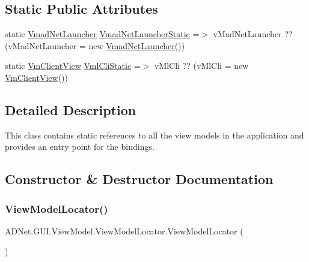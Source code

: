 \subsection*{Static Public Attributes}
\begin{DoxyCompactItemize}
\item 
static \hyperlink{class_a_d_net_1_1_g_u_i_1_1_view_model_1_1_vmad_net_launcher}{Vmad\+Net\+Launcher} \hyperlink{class_a_d_net_1_1_g_u_i_1_1_view_model_1_1_view_model_locator_a04e0f62e6c93901369e1f394255f9dd4}{Vmad\+Net\+Launcher\+Static} =$>$ v\+Mad\+Net\+Launcher ?? (v\+Mad\+Net\+Launcher = new \hyperlink{class_a_d_net_1_1_g_u_i_1_1_view_model_1_1_vmad_net_launcher}{Vmad\+Net\+Launcher}())
\item 
static \hyperlink{class_a_d_net_1_1_g_u_i_1_1_view_model_1_1_vm_client_view}{Vm\+Client\+View} \hyperlink{class_a_d_net_1_1_g_u_i_1_1_view_model_1_1_view_model_locator_abfa3b191a10cd9af2b53c93abd95c5bb}{Vml\+Cli\+Static} =$>$ v\+Ml\+Cli ?? (v\+Ml\+Cli = new \hyperlink{class_a_d_net_1_1_g_u_i_1_1_view_model_1_1_vm_client_view}{Vm\+Client\+View}())
\end{DoxyCompactItemize}


\subsection{Detailed Description}
This class contains static references to all the view models in the application and provides an entry point for the bindings. 



\subsection{Constructor \& Destructor Documentation}
\mbox{\label{class_a_d_net_1_1_g_u_i_1_1_view_model_1_1_view_model_locator_afd33185cda62ddf47d114be2978693a6}} 
\subsubsection{\texorpdfstring{View\+Model\+Locator()}{ViewModelLocator()}}
{\footnotesize\ttfamily A\+D\+Net.\+G\+U\+I.\+View\+Model.\+View\+Model\+Locator.\+View\+Model\+Locator (\begin{DoxyParamCaption}{ }\end{DoxyParamCaption})}



